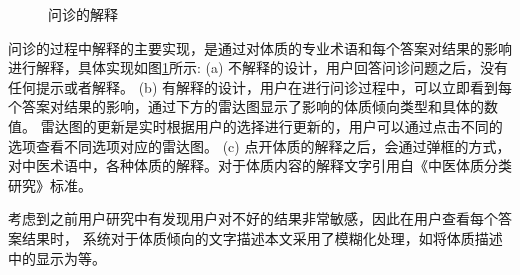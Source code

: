 \begin{figure}[htbp]
    \caption{问诊的解释} 
    \label{fig:questions}
\end{figure}

问诊的过程中解释的主要实现，是通过对体质的专业术语和每个答案对结果的影响进行解释，具体实现如图\ref{fig:questions}所示:
(a) 不解释的设计，用户回答问诊问题之后，没有任何提示或者解释。
(b) 有解释的设计，用户在进行问诊过程中，可以立即看到每个答案对结果的影响，通过下方的雷达图显示了影响的体质倾向类型和具体的数值。
雷达图的更新是实时根据用户的选择进行更新的，用户可以通过点击不同的选项查看不同选项对应的雷达图。
(c) 点开体质的解释之后，会通过弹框的方式，对中医术语中，各种体质的解释。对于体质内容的解释文字引用自《中医体质分类研究》标准。

考虑到之前用户研究中有发现用户对不好的结果非常敏感，因此在用户查看每个答案结果时，
系统对于体质倾向的文字描述本文采用了模糊化处理，如将体质描述中的显示为等。



